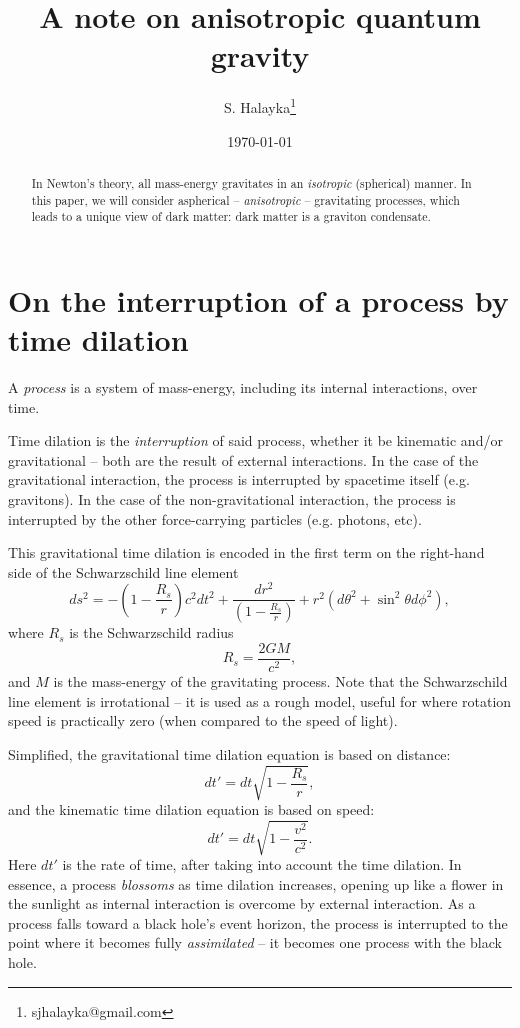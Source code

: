 \documentclass[12pt]{article}
\title{A note on anisotropic quantum gravity}
\author{S. Halayka\footnote{sjhalayka@gmail.com}}
\date{\today\;\currenttime}
\begin{document}
 
\maketitle

\begin{abstract}
In Newton's theory, all mass-energy gravitates in an {\textit{isotropic}} (spherical) manner.
In this paper, we will consider aspherical -- {\textit{anisotropic}} -- gravitating processes, which leads to a unique view of dark matter: dark matter is a graviton condensate.
\end{abstract}






\section{On the interruption of a process by time dilation}

A {\textit{process}} is a system of mass-energy, including its internal interactions, over time.

Time dilation is the {\textit{interruption}} of said process, whether it be kinematic and/or gravitational -- both are the result of external interactions.
In the case of the gravitational interaction, the process is interrupted by spacetime itself (e.g. gravitons).
In the case of the non-gravitational interaction, the process is interrupted by the other force-carrying particles (e.g. photons, etc).

This gravitational time dilation \cite{misner} is encoded in the first term on the right-hand side of the Schwarzschild line element
\begin{equation}
ds^2 = -\left( 1 - \frac{R_s}{r} \right) c^2 dt^2 + \frac{dr^2}{\left( 1 - \frac{R_s}{r} \right)} + r^2 (d\theta^2 + \sin^2 \theta d\phi^2),
\end{equation}
where $R_s$ is the Schwarzschild radius
\begin{equation}
R_s = \frac{2GM}{c^2},
\end{equation}
and $M$ is the mass-energy of the gravitating process.
Note that the Schwarzschild line element is irrotational -- it is used as a rough model, useful for where rotation speed is practically zero (when compared to the speed of light).

Simplified, the gravitational time dilation equation is based on distance:
\begin{equation}
dt' = dt \sqrt{1 - \frac{R_s}{r}},
\end{equation}
and the kinematic time dilation equation is based on speed:
\begin{equation}
dt' = dt \sqrt{1 - \frac{v^2}{c^2}}.
\end{equation}
Here $dt'$ is the rate of time, after taking into account the time dilation.
In essence, a process {\textit{blossoms}} as time dilation increases, opening up like a flower in the sunlight as internal interaction is overcome by external interaction.
As a process falls toward a black hole's event horizon, the process is interrupted to the point where it becomes fully {\textit{assimilated}} -- it becomes one process with the black hole.
\end{document}
